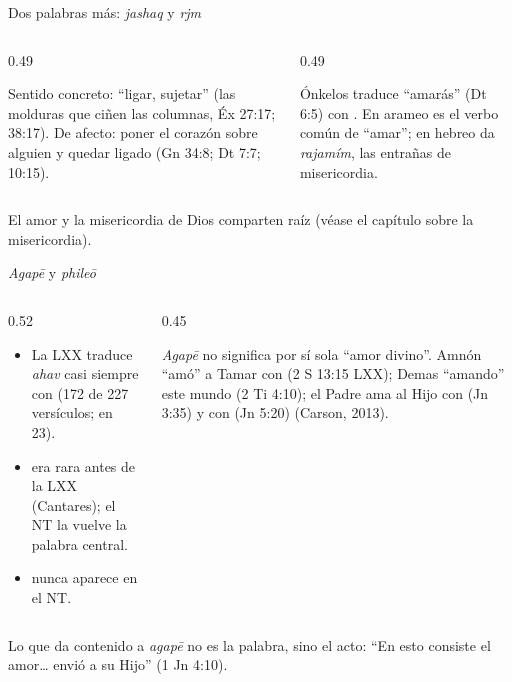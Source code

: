 \begin{frame}{Dos palabras más: \emph{jashaq} y \emph{rjm}}
\begin{columns}[t,onlytextwidth]
\begin{column}{0.49\textwidth}
\begin{tcolorbox}[colback=papiro,colframe=azul,boxrule=0.8pt,arc=3pt,title={\heb{חָשַׁק} \emph{jashaq}},coltitle=papiro,colbacktitle=azul,fonttitle=\small\bfseries]
\small Sentido concreto: ``ligar, sujetar'' (las molduras que ciñen las columnas, Éx 27:17; 38:17). De afecto: poner el corazón sobre alguien y quedar ligado (Gn 34:8; Dt 7:7; 10:15).
\end{tcolorbox}
\end{column}
\begin{column}{0.49\textwidth}
\begin{tcolorbox}[colback=papiro,colframe=azul,boxrule=0.8pt,arc=3pt,title={\heb{רחם} \emph{rjm}},coltitle=papiro,colbacktitle=azul,fonttitle=\small\bfseries]
\small Ónkelos traduce ``amarás'' (Dt 6:5) con . En arameo es el verbo común de ``amar''; en hebreo da \emph{rajamím}, las entrañas de misericordia.
\end{tcolorbox}
\end{column}
\end{columns}\medskip
\small El amor y la misericordia de Dios comparten raíz (véase el capítulo sobre la misericordia).
\end{frame}

\begin{frame}{\emph{Agapē} y \emph{phileō}}
\begin{columns}[c,onlytextwidth]
\begin{column}{0.52\textwidth}\small
\begin{itemize}
\item La LXX traduce \emph{ahav} casi siempre con  (172 de 227 versículos;  en 23).
\item {} era rara antes de la LXX (Cantares); el NT la vuelve la palabra central.
\item {} nunca aparece en el NT.
\end{itemize}
\end{column}
\begin{column}{0.45\textwidth}
\begin{tcolorbox}[colback=dorado!10,colframe=dorado!85!azul,boxrule=0.6pt,arc=2pt,title={Falacia de la raíz},fonttitle=\scriptsize\bfseries,coltitle=azuloscuro,colbacktitle=dorado!30]
\scriptsize \emph{Agapē} no significa por sí sola ``amor divino''. Amnón ``amó'' a Tamar con  (2 S 13:15 LXX); Demas ``amando'' este mundo (2 Ti 4:10); el Padre ama al Hijo con  (Jn 3:35) y con  (Jn 5:20) (Carson, 2013).
\end{tcolorbox}
\end{column}
\end{columns}\medskip
\small Lo que da contenido a \emph{agapē} no es la palabra, sino el acto: ``En esto consiste el amor\ldots{} envió a su Hijo'' (1 Jn 4:10).
\end{frame}

